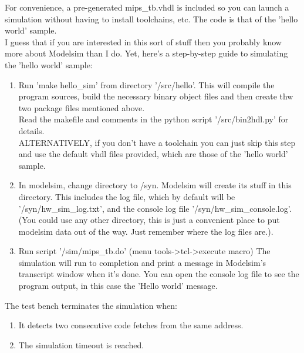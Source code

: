 \documentclass[11pt]{article}
\begin{document}
    For convenience, a pre-generated mips\_tb.vhdl is included so you can launch
    a simulation without having to install toolchains, etc. The code is that
    of the 'hello world' sample.\\

    I guess that if you are interested in this sort of stuff then you probably
    know more about Modelsim than I do. Yet, here's a step-by-step guide to
    simulating the 'hello world' sample:
    
\begin{enumerate}
    \item Run 'make hello\_sim' from directory '/src/hello'.
        This will compile the program sources, build the necessary binary object
        files and then create thw two package files mentioned above.\\
        Read the makefile and comments in the python script '/src/bin2hdl.py'
        for details.\\

        ALTERNATIVELY, if you don't have a toolchain you can just skip this
        step and use the default vhdl files provided, which are those of the
        'hello world' sample.\\

    \item In modelsim, change directory to /syn. Modelsim will create its stuff 
        in this directory. This includes the
        log file, which by default will be '/syn/hw\_sim\_log.txt', and the 
        console log file '/syn/hw\_sim\_console.log'.\\
        (You could use any other directory, this is just a convenient place to
        put modelsim data out of the way. Just remember where the log files
        are.).

    \item Run script '/sim/mips\_tb.do' (menu tools-\textgreater tcl-\textgreater execute macro)
        The simulation will run to completion and print a message in Modelsim's 
        transcript window when it's done. You can open the console log file 
        to see the program output, in this case the 'Hello world' message.\\

\end{enumerate}
    
    The test bench terminates the simulation when:
    
\begin{enumerate}
    
    \item It detects two consecutive code fetches from the same address.
    \item The simulation timeout is reached.
    
\end{enumerate}
    
\end{document}
